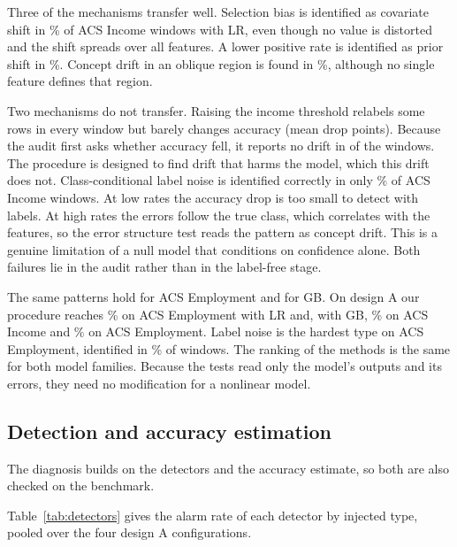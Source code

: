 \documentclass[10pt]{article}
\newcommand{\keep}[1]{\needspace{#1\baselineskip}}
\begin{document}
Three of the mechanisms transfer well. Selection bias is identified as covariate shift in \% of ACS Income windows with LR, even though no value is distorted and the shift spreads over all features. A lower positive rate is identified as prior shift in \%. Concept drift in an oblique region is found in \%, although no single feature defines that region.

Two mechanisms do not transfer. Raising the income threshold relabels some rows in every window but barely changes accuracy (mean drop  points). Because the audit first asks whether accuracy fell, it reports no drift in  of the  windows. The procedure is designed to find drift that harms the model, which this drift does not. Class-conditional label noise is identified correctly in only \% of ACS Income windows. At low rates the accuracy drop is too small to detect with  labels. At high rates the errors follow the true class, which correlates with the features, so the error structure test reads the pattern as concept drift. This is a genuine limitation of a null model that conditions on confidence alone. Both failures lie in the audit rather than in the label-free stage.

The same patterns hold for ACS Employment and for GB. On design A our procedure reaches \% on ACS Employment with LR and, with GB, \% on ACS Income and \% on ACS Employment. Label noise is the hardest type on ACS Employment, identified in \% of windows. The ranking of the methods is the same for both model families. Because the tests read only the model's outputs and its errors, they need no modification for a nonlinear model.

\keep{6}\subsection{Detection and accuracy estimation}
\label{sec:res-detection}
The diagnosis builds on the detectors and the accuracy estimate, so both are also checked on the benchmark.

\keep{14}Table~\ref{tab:detectors} gives the alarm rate of each detector by injected type, pooled over the four design A configurations.
\end{document}
